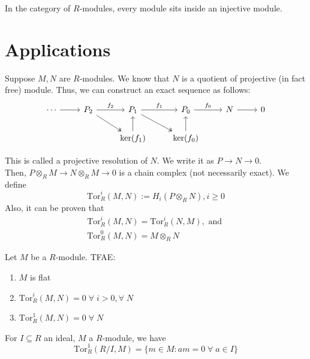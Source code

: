 \documentclass[oneside, 12pt]{scrbook}
\theoremstyle{theorem}
\begin{document}
\begin{remark}
In the category of $R$-modules, every module sits inside an injective module.
\end{remark}

\section{Applications}

Suppose $M,N$ are $R$-modules. We know that $N$ is a quotient of projective (in fact free) module. Thus, we can construct an exact sequence as follows: 
\[\begin{tikzcd}
	{\cdots } & {P_{2}} & {P_{1}} & {P_{0}} & N & 0 \\
	&& {\ker(f_{1})} & {\ker(f_{0})}
	\arrow["{f_{1}}", from=1-3, to=1-4]
	\arrow[from=1-1, to=1-2]
	\arrow["{f_{2}}", from=1-2, to=1-3]
	\arrow["{f_{0}}", from=1-4, to=1-5]
	\arrow[from=1-5, to=1-6]
	\arrow[two heads, from=1-2, to=2-3]
	\arrow[from=2-3, to=1-3]
	\arrow[two heads, from=1-3, to=2-4]
	\arrow[from=2-4, to=1-4]
\end{tikzcd}\]

This is called a projective resolution of $N$. We write it as $P \rightarrow N \rightarrow 0$. \\

Then, $P \otimes_{R}M \rightarrow N \otimes_{R} M \rightarrow 0$ is a chain complex (not necessarily exact). We define 
\begin{equation*}
\mathrm{Tor}_{R}^i (M,N) := H_{i}(P \otimes_{R} N), i \geq 0
\end{equation*}
Also, it can be proven that 
\begin{eqnarray}
\mathrm{Tor}_{R}^i (M,N) = \mathrm{Tor}_{R}^i (N,M) , \text{ and } \\
\mathrm{Tor}_{R}^0 (M,N) = M \otimes_{R} N
\end{eqnarray}

\begin{theorem}
Let $M$ be a $R$-module. TFAE:
\begin{enumerate}
\item $M$ is flat 
\item $\mathrm{Tor}_{R}^i (M,N) = 0 \; \forall \; i >0, \forall \; N$
\item $\mathrm{Tor}_{R}^1 (M,N) = 0 \; \forall \; N$
\end{enumerate}
\end{theorem}

\begin{exercise}
For $I \subseteq R$ an ideal, $M$ a $R$-module, we have 
\begin{equation*}
\mathrm{Tor}^{1}_{R}(R/I , M) = \{m \in M : am=0 \; \forall \; a\in I\}
\end{equation*}
\end{exercise}
\end{document}
